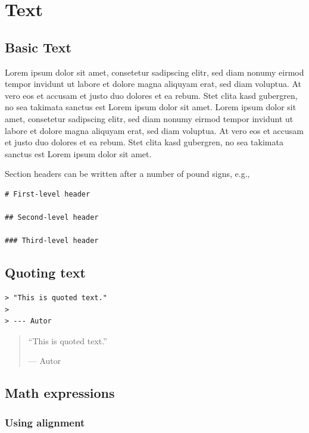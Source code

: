 \documentclass[oneside, 12pt, a4paper]{article}
\begin{document}
\hypertarget{text}{%
\section{Text}\label{text}}

\hypertarget{basic-text}{%
\subsection{Basic Text}\label{basic-text}}

Lorem ipsum dolor sit amet, consetetur sadipscing elitr, sed diam nonumy
eirmod tempor invidunt ut labore et dolore magna aliquyam erat, sed diam
voluptua. At vero eos et accusam et justo duo dolores et ea rebum. Stet
clita kasd gubergren, no sea takimata sanctus est Lorem ipsum dolor sit
amet. Lorem ipsum dolor sit amet, consetetur sadipscing elitr, sed diam
nonumy eirmod tempor invidunt ut labore et dolore magna aliquyam erat,
sed diam voluptua. At vero eos et accusam et justo duo dolores et ea
rebum. Stet clita kasd gubergren, no sea takimata sanctus est Lorem
ipsum dolor sit amet.

Section headers can be written after a number of pound signs, e.g.,

\begin{verbatim}
# First-level header

## Second-level header

### Third-level header
\end{verbatim}

\hypertarget{quoting-text}{%
\subsection{Quoting text}\label{quoting-text}}

\begin{verbatim}
> "This is quoted text."
>
> --- Autor
\end{verbatim}

\begin{quote}
``This is quoted text.''

--- Autor
\end{quote}

\hypertarget{math-expressions}{%
\subsection{Math expressions}\label{math-expressions}}

\hypertarget{using-alignment}{%
\subsubsection{Using alignment}\label{using-alignment}}
\end{document}
